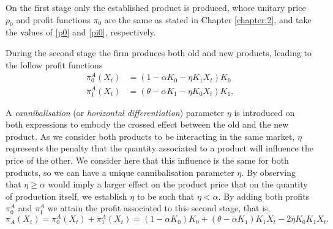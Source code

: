 On the first stage only the established product is produced, whose unitary price $p_0$ and profit functions $\pi_0$ are the same as stated in Chapter \ref{chapter:2}, and take the values of \eqref{p0} and \eqref{pi0}, respectively.

During the second stage the firm produces both old and new products, leading to the follow profit functions
\begin{align}
\pi_0^A(X_t)&=(1-\alpha K_0-\eta K_1 X_t) K_0\\
\pi_1^A(X_t)&=(\theta-\alpha K_1-\eta K_0 X_t) K_1.
\end{align}

A \textit{cannibalisation} (or\textit{ horizontal differentiation}) parameter $\eta$ is introduced on both expressions to embody the crossed effect between the old and the new product. As we consider both products to be interacting in the same market, $\eta$ represents the penalty that the quantity
associated to a product will influence the price of the other. We consider here
that this influence is the same for both products, so we can have a unique cannibalisation parameter $\eta$.
By observing that $\eta\geq \alpha$ would imply a larger effect on the product price that on the quantity of production itself, we establish $\eta$ to be such that $\eta < \alpha$. 
By adding both profits $\pi^A_0$ and $\pi_1^A$ we attain the profit associated to this second stage, that is,
\begin{equation}
\pi_A(X_t)=\pi_0^A(X_t)+\pi_1^A(X_t)=(1-\alpha K_0)K_0+(\theta-\alpha K_1)K_1X_t-2\eta K_0 K_1 X_t.
\end{equation}








